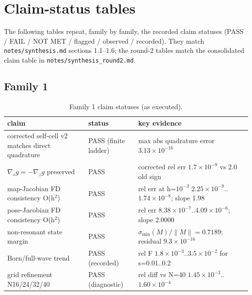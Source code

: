 \documentclass[12pt]{article}
\begin{document}
\appendix
\section{Claim-status tables}\label{app:claims}

The following tables repeat, family by family, the recorded claim statuses
(PASS / FAIL / NOT MET / flagged / observed / recorded). They match
\texttt{notes/synthesis.md} sections 1.1--1.6; the round-2 tables match the
consolidated claim table in \texttt{notes/synthesis\_round2.md}.

\subsection{Family 1}
\begin{table}[ht]
\centering
\small
\caption{Family 1 claim statuses (as executed).}
\label{app:tab:f1}
\begin{tabular}{p{} p{} p{}}
\toprule
claim & status & key evidence \\
\midrule
corrected self-cell v2 matches direct quadrature & PASS (finite ladder) &
max abs quadrature error $3.13\times10^{-16}$ \\
$\nabla_s g=-\nabla_z g$ preserved & PASS &
corrected rel err $1.7\times10^{-9}$ vs 2.0 old sign \\
map-Jacobian FD consistency O(h$^2$) & PASS &
rel err at h=$10^{-3}$ $2.25\times10^{-9}$..$1.74\times10^{-8}$; slope 1.98 \\
pose-Jacobian FD consistency O(h$^2$) & PASS &
rel err $8.38\times10^{-7}$..$4.09\times10^{-6}$; slope 2.0000 \\
non-resonant state margin & PASS &
$\sigma_{\min}(M)/\|M\|=0.7189$; residual $9.3\times10^{-16}$ \\
Born/full-wave trend & PASS (recorded) &
rel F $1.8\times10^{-3}$..$3.5\times10^{-2}$ for s=0.01..0.2 \\
grid refinement N16/24/32/40 & PASS (diagnostic) &
rel diff vs N=40 $1.45\times10^{-3}$..$1.60\times10^{-4}$ \\
\bottomrule
\end{tabular}
\end{table}
\end{document}
